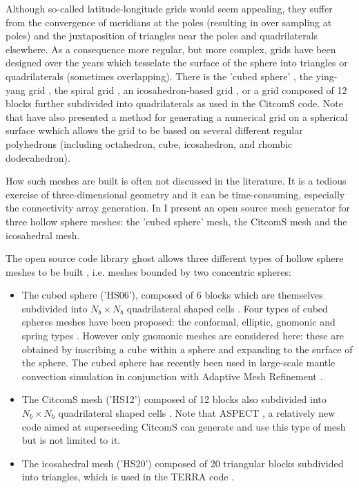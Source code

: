 Although so-called latitude-longitude grids would seem appealing, they suffer from the convergence of meridians at the poles
(resulting in over sampling at poles)
and the juxtaposition of triangles near the poles and quadrilaterals elsewhere. 
As a consequence more regular, but more complex, grids have been designed over the years which tesselate the surface of the 
sphere into triangles or quadrilaterals (sometimes overlapping).
There is the 'cubed sphere' \cite{roip96,heta03,chcc07,yiym19},
the ying-yang grid \cite{kasa04,yoka04,kaks08,tack08,crta14,crta16}, 
the spiral grid \cite{hust08}, 
an icosahedron-based grid \cite{bafr85,tasu01},
or a grid composed of 12 blocks further subdivided into quadrilaterals \cite{zhzm00} as used in the CitcomS code.
Note that \cite{oldp12} have also presented a method for generating a numerical grid on a spherical surface wwhich 
allows the grid to be based on several different regular polyhedrons (including octahedron, cube, icosahedron,
and rhombic dodecahedron).

How such meshes are built is often not discussed in the literature. It is 
a tedious exercise of three-dimensional geometry and it can be time-consuming, especially 
the connectivity array generation. In \cite{thie18} I present an open source 
mesh generator for three hollow sphere meshes: the 'cubed sphere' mesh, the CitcomS mesh and the 
icosahedral mesh.


The open source code library {\sc ghost}\cite{thie18} allows 
three different types of hollow sphere meshes to be built
, i.e. meshes bounded by two concentric spheres:

\begin{itemize}
\item 
The cubed sphere ('HS06'), composed of 6 blocks which 
are themselves subdivided into $N_b \times N_b$ quadrilateral shaped cells  \cite{sado72,roip96,heta03,busa13}.
Four types of cubed spheres meshes have been proposed: the conformal, elliptic, gnomonic and spring types \cite{puli07}.
However only gnomonic meshes are considered here: these are obtained by inscribing a cube within a sphere and expanding to the surface
of the sphere.
The cubed sphere has recently been used in large-scale mantle convection simulation in conjunction with 
Adaptive Mesh Refinement \cite{algs12,busa13}.  

\item 
The CitcomS mesh ('HS12') composed of 12 blocks also subdivided 
into $N_b \times N_b$ quadrilateral shaped cells
\cite{zhzm00,sthh06,zhmt08,arfw14}.
Note that ASPECT \cite{krhb12,hedg17}, a relatively new code aimed at superseeding CitcomS can generate and use 
this type of mesh \cite{thie17} but is not limited to it.

\item The icosahedral mesh ('HS20') composed of 20 triangular blocks \cite{bafr85,baum85} subdivided into triangles, which is 
used in the TERRA code \cite{burb96,burb97,burl98,dadb13}.
\end{itemize}

